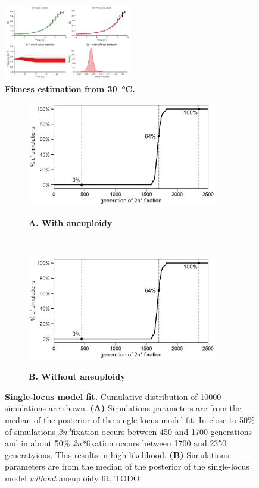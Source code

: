 \documentclass[12pt]{extarticle}
\newcommand{\eumt}{\emph{2n*}}
\begin{document}
\begin{figure}[h]
    \centering
	\includegraphics[width=0.5\textwidth]{../figures/evo39_fitness_30deg.pdf}
    \caption{
    \textbf{Fitness estimation from \SI{30}{\celsius}.}
    } 
    \label{fig:growth-curves-30deg}
\end{figure}

\begin{figure}[b!]
  \centering
  \begin{subfigure}[t]{0.5\textwidth}
      \caption{
        \textbf{A. With aneuploidy}
      }
      \centering
      \includegraphics[height=1.8in]{../figures/likelihood-plot.pdf}      
      \label{fig:likelihood-with-aneuploidy}
  \end{subfigure}%
  \\
  \begin{subfigure}[t]{0.5\textwidth}
  	  \caption{
        \textbf{B. Without aneuploidy}
      }
      \centering
      \includegraphics[height=1.8in]{../figures/likelihood-plot.pdf}      
      \label{fig:likelihood-without-aneuploidy}
  \end{subfigure}
  \caption{
    \textbf{Single-locus model fit.} Cumulative distribution of 10000 simulations are shown.
    \textbf{(A)} Simulations parameters are from the median of the posterior of the single-locus model fit. In close to 50\% of simulations \eumt fixation occurs between 450 and 1700 generations and in about 50\% \eumt fixation occurs between 1700 and 2350 generatyions. This results in high likelihood.
    \textbf{(B)} Simulations parameters are from the median of the posterior of the single-locus model \emph{without} aneuploidy fit. TODO
  }
  \label{fig:likelihood}
\end{figure}
\end{document}
